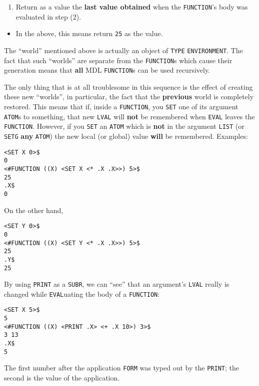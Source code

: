 \documentclass[a4paper]{scrbook}
\providecommand{\tightlist}{%
  \setlength{\itemsep}{0pt}\setlength{\parskip}{0pt}}
\begin{document}
\begin{enumerate}
\def\labelenumi{\arabic{enumi}.}
\setcounter{enumi}{3}
\tightlist
\item
  Return as a value the \textbf{last value obtained} when the \texttt{FUNCTION}'s body was evaluated in step (2).
\end{enumerate}

\begin{itemize}
\tightlist
\item
  In the above, this means return \texttt{25} as the value.
\end{itemize}

The ``world'' mentioned above is actually an object of \texttt{TYPE} \texttt{ENVIRONMENT}. The
fact that such ``worlds'' are separate from the \texttt{FUNCTION}s which cause their generation means that \textbf{all} MDL
\texttt{FUNCTION}s can be used recursively.

The only thing that is at all troublesome in this sequence is the effect of creating these new ``worlds'', in particular,
the fact that the \textbf{previous} world is completely restored. This means that if, inside a \texttt{FUNCTION}, you
\texttt{SET} one of its argument \texttt{ATOM}s to something, that new \texttt{LVAL} will \textbf{not} be remembered when
\texttt{EVAL} leaves the \texttt{FUNCTION}. However, if you \texttt{SET} an \texttt{ATOM} which is \textbf{not} in the
argument \texttt{LIST} (or \texttt{SETG} \textbf{any} \texttt{ATOM}) the new local (or global) value
\textbf{will} be remembered. Examples:

\begin{verbatim}
<SET X 0>$
0
<#FUNCTION ((X) <SET X <* .X .X>>) 5>$
25
.X$
0
\end{verbatim}

On the other hand,

\begin{verbatim}
<SET Y 0>$
0
<#FUNCTION ((X) <SET Y <* .X .X>>) 5>$
25
.Y$
25
\end{verbatim}

By using \texttt{PRINT} as a \texttt{SUBR}, we can ``see'' that an argument's \texttt{LVAL} really is changed while
\texttt{EVAL}uating the body of a \texttt{FUNCTION}:

\begin{verbatim}
<SET X 5>$
5
<#FUNCTION ((X) <PRINT .X> <+ .X 10>) 3>$
3 13
.X$
5
\end{verbatim}

The first number after the application \texttt{FORM} was typed out by the \texttt{PRINT}; the second is the value of the
application.
\end{document}
